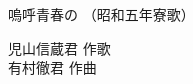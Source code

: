 \documentclass[10pt,b5j]{tarticle} %
\begin{document}
\begin{minipage}[c]{0.7\hsize} %
    \begin{center}
        {\LARGE
            嗚呼青春の %
        }
        {\small 
            （昭和五年寮歌） %
        }
    \end{center}
\end{minipage}
\begin{minipage}[c]{0.3\hsize} %
    \begin{flushright} %
        児山信蔵君 作歌\\有村徹君 作曲 %
    \end{flushright}
\end{minipage}
\end{document}
